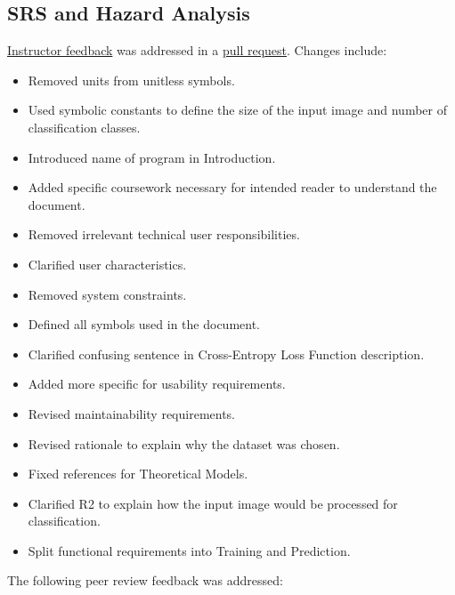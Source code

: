 \documentclass{article}
\begin{document}

\subsection{SRS and Hazard Analysis}

\href{https://github.com/ptrandev/OCRacle/issues/3}{Instructor feedback} was addressed in
a \href{https://github.com/ptrandev/OCRacle/pull/29}{pull request}. Changes include:

\begin{itemize}
  \item Removed units from unitless symbols.
  \item Used symbolic constants to define the size of the input image and number of classification classes.
  \item Introduced name of program in Introduction.
  \item Added specific coursework necessary for intended reader to understand the document.
  \item Removed irrelevant technical user responsibilities.
  \item Clarified user characteristics.
  \item Removed system constraints.
  \item Defined all symbols used in the document.
  \item Clarified confusing sentence in Cross-Entropy Loss Function description.
  \item Added more specific for usability requirements.
  \item Revised maintainability requirements.
  \item Revised rationale to explain why the dataset was chosen.
  \item Fixed references for Theoretical Models.
  \item Clarified R2 to explain how the input image would be processed for classification.
  \item Split functional requirements into Training and Prediction.
\end{itemize}

\noindent The following peer review feedback was addressed:
\end{document}
